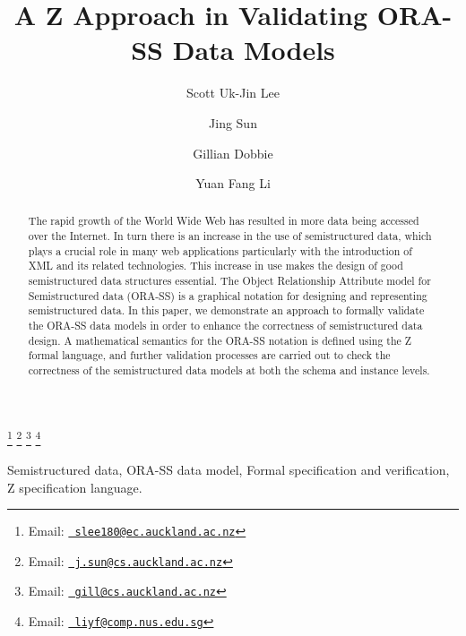 \documentclass{entcs}
\begin{document}
\begin{frontmatter}
  \title{A Z Approach in Validating ORA-SS Data Models}
  \author{Scott Uk-Jin Lee}
  \author{Jing Sun}
  \author{Gillian Dobbie}
  \address{Department of Computer Science\\The University of Auckland\\
    Auckland, New Zealand}
  \author{Yuan Fang Li}
  \address{School of Computing\\National University of Singapore\\
    Singapore, Republic of Singapore}
  \thanks[slee180@ec.auckland.ac.nz]{Email:
    \href{mailto:slee180@ec.auckland.ac.nz} {\texttt{\normalshape
        slee180@ec.auckland.ac.nz}}}
  \thanks[j.sun@cs.auckland.ac.nz]{Email:
    \href{mailto:j.sun@cs.auckland.ac.nz} {\texttt{\normalshape
        j.sun@cs.auckland.ac.nz}}}
  \thanks[gill@cs.auckland.ac.nz]{Email:
    \href{gill@cs.auckland.ac.nz} {\texttt{\normalshape
        gill@cs.auckland.ac.nz}}}
  \thanks[liyf@comp.nus.edu.sg]{Email:
    \href{mailto:liyf@comp.nus.edu.sg} {\texttt{\normalshape
        liyf@comp.nus.edu.sg}}}
\begin{abstract}
  The rapid growth of the World Wide Web has resulted in more data
being accessed over the Internet. In turn there is an increase in
the use of semistructured data, which plays a crucial role in many
web applications particularly with the introduction of XML and its
related technologies. This increase in use makes the design of
good semistructured data structures essential. The Object
Relationship Attribute model for Semistructured data (ORA-SS) is a
graphical notation for designing and representing semistructured
data. In this paper, we demonstrate an approach to formally
validate the ORA-SS data models in order to enhance the
correctness of semistructured data design. A mathematical
semantics for the ORA-SS notation is defined using the Z formal
language, and further validation processes are carried out to
check the correctness of the semistructured data models at both
the schema and instance levels.
\end{abstract}
\begin{keyword}
  Semistructured data, ORA-SS data model, Formal specification and
  verification, Z specification language.
\end{keyword}
\end{frontmatter}
\end{document}
